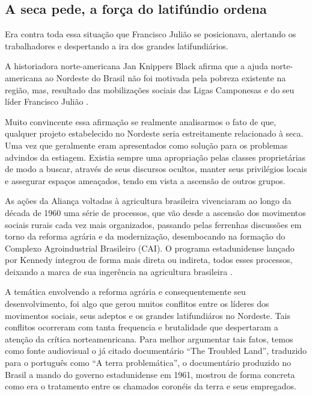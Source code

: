 \begin{refsection}
    \section{A seca pede, a força do latifúndio ordena}

    Era contra toda essa situação que Francisco Julião se posicionava, alertando os trabalhadores e despertando a ira dos grandes latifundiários.  

    A historiadora norte-americana Jan Knippers Black afirma que a ajuda norte-americana ao Nordeste do Brasil não foi motivada pela pobreza existente na região, mas, resultado das mobilizações sociais das Ligas Camponesas e do seu líder Francisco Julião \cite[p.~161]{Black2009Penetracao}.

    Muito convincente essa afirmação se realmente analisarmos o fato de que, qualquer projeto estabelecido no Nordeste seria estreitamente relacionado à seca. Uma vez que geralmente eram apresentados como solução para os problemas advindos da estiagem. Existia sempre uma apropriação pelas classes proprietárias de modo a buscar, através de seus discursos ocultos, manter seus privilégios locais e assegurar espaços ameaçados, tendo em vista a ascensão de outros grupos. 

    As ações da Aliança voltadas à agricultura brasileira vivenciaram ao longo da década de 1960 uma série de processos, que vão desde a ascensão dos movimentos sociais rurais cada vez mais organizados, passando pelas ferrenhas discussões em torno da reforma agrária e da modernização, desembocando na formação do Complexo Agroindustrial Brasileiro (CAI). O programa estadunidense lançado por Kennedy integrou de forma mais direta ou indireta, todos esses processos, deixando a marca de sua ingerência na agricultura brasileira \cite[p.~21]{Natividade2018Alianca}.

    A temática envolvendo a reforma agrária e consequentemente seu desenvolvimento, foi algo que gerou muitos conflitos entre os líderes dos movimentos sociais, seus adeptos e os grandes latifundiáros no Nordeste. Tais conflitos ocorreram com tanta frequencia e brutalidade que despertaram a atenção da crítica norteamenricana. Para melhor argumentar tais fatos, temos como fonte audiovisual o já citado documentário ``The Troubled Land'', traduzido para o português como ``A terra problemática'', o documentário produzido no Brasil a mando do governo estadunidense em 1961, mostrou de forma concreta como era o tratamento entre os chamados coronéis da terra e seus empregados.


\end{refsection}
